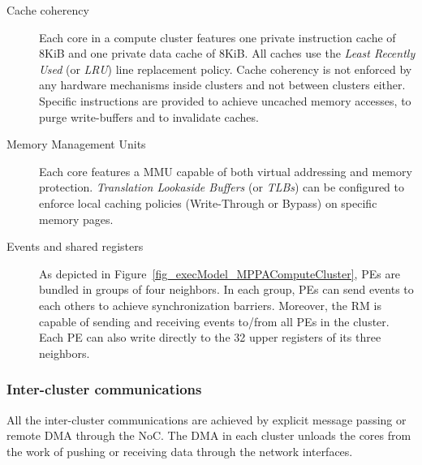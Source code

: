 \documentclass[main.tex]{subfiles}
\begin{document}
\begin{description}
    \item[Cache coherency]
        Each core in a compute cluster features one private instruction cache of 8KiB and one private data cache of 8KiB. All caches use the \emph{Least Recently Used} (or \emph{LRU}) line replacement policy. Cache coherency is not enforced by any hardware mechanisms inside clusters and not between clusters either. Specific instructions are provided to achieve uncached memory accesses, to purge write-buffers and to invalidate caches.

    \item[Memory Management Units]
        Each core features a MMU capable of both virtual addressing and memory protection. \emph{Translation Lookaside Buffers} (or \emph{TLBs}) can be configured to enforce local caching policies (Write-Through or Bypass) on specific memory pages.


    \item[Events and shared registers]
        As depicted in Figure~\ref{fig_execModel_MPPAComputeCluster}, PEs are bundled in groups of four neighbors. In each group, PEs can send events to each others to achieve synchronization barriers. Moreover, the RM is capable of sending and receiving events to/from all PEs in the cluster.
        Each PE can also write directly to the 32 upper registers of its three neighbors. 
\end{description}


\subsubsection{Inter-cluster communications}
All the inter-cluster communications are achieved by explicit message passing or remote DMA through the NoC. The DMA in each cluster unloads the cores from the work of pushing or receiving data through the network interfaces. 
\end{document}
